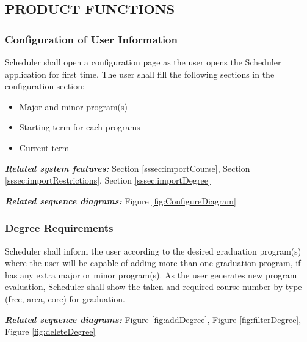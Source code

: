 \documentclass[twoside,letterpaper]{article}
\begin{document}
\subsection[PRODUCT
FUNCTIONS]{\rmfamily\bfseries\color{black}
PRODUCT FUNCTIONS}

\subsubsection[Configuration of User Information
]{\rmfamily\bfseries\color{black}
Configuration of User Information}

{\color{black}
Scheduler shall open a configuration page as the user opens the Scheduler application for first time. The user shall fill the following sections in the configuration section:}

\begin{itemize}
			\item Major and minor program(s)
			\item Starting term for each programs
			\item Current term	
		\end{itemize}
	
\smallskip

{\color{black}
\emph{\textbf{Related system features:}} Section \ref{sssec:importCourse}, Section \ref{sssec:importRestrictions}, Section \ref{sssec:importDegree}}

\smallskip

{\color{black}
\emph{\textbf{Related sequence diagrams:}} Figure \ref{fig:ConfigureDiagram}}

\subsubsection[Degree Requirements
]{\rmfamily\bfseries\color{black}
	Degree Requirements}

{\color{black}
	Scheduler shall inform the user according to the desired graduation program(s) where the user will be capable of adding more than one graduation program, if has any extra major or minor program(s). As the user generates new program evaluation, Scheduler shall show the taken and required course number by type (free, area, core) for graduation.}

\smallskip

{\color{black}
\emph{\textbf{Related sequence diagrams:}} Figure \ref{fig:addDegree}, Figure \ref{fig:filterDegree}, Figure \ref{fig:deleteDegree}}
\end{document}
